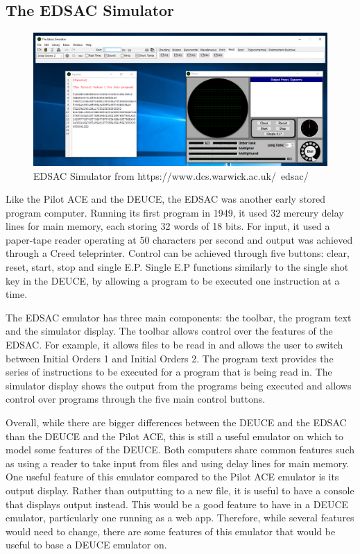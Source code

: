 \documentclass{l4proj}
\begin{document}
\subsection{The EDSAC Simulator}
\begin{figure}[h!]
	\centering
	\includegraphics[width=\linewidth]{images/edsac-emu}
	\caption{EDSAC Simulator from https://www.dcs.warwick.ac.uk/~edsac/}
	\label{fig:edsac}
\end{figure}

Like the Pilot ACE and the DEUCE, the EDSAC was another early stored program computer. Running its first program in 1949, it used 32 mercury delay lines for main memory, each storing 32 words of 18 bits. For input, it used a paper-tape reader operating at 50 characters per second and output was achieved through a Creed teleprinter. Control can be achieved through five buttons: clear, reset, start, stop and single E.P. Single E.P functions similarly to the single shot key in the DEUCE, by allowing a program to be executed one instruction at a time. 

The EDSAC emulator has three main components: the toolbar, the program text and the simulator display. 
The toolbar allows control over the features of the EDSAC. For example, it allows files to be read in and allows the user to switch between Initial Orders 1 and Initial Orders 2. The program text provides the series of instructions to be executed for a program that is being read in. The simulator display shows the output from the programs being executed and allows control over programs through the five main control buttons.

Overall, while there are bigger differences between the DEUCE and the EDSAC than the DEUCE and the Pilot ACE, this is still a useful emulator on which to model some features of the DEUCE. Both computers share common features such as using a reader to take input from files and using delay lines for main memory. One useful feature of this emulator compared to the Pilot ACE emulator is its output display. Rather than outputting to a new file, it is useful to have a console that displays output instead. This would be a good feature to have in a DEUCE emulator, particularly one running as a web app. Therefore, while several features would need to change, there are some features of this emulator that would be useful to base a DEUCE emulator on.
\end{document}
